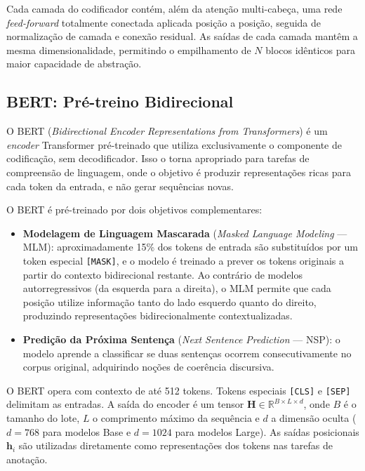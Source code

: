 Cada camada do codificador contém, além da atenção multi-cabeça, uma rede \textit{feed-forward}
totalmente conectada aplicada posição a posição, seguida de normalização de camada e conexão
residual. As saídas de cada camada mantêm a mesma dimensionalidade, permitindo o empilhamento
de $N$ blocos idênticos para maior capacidade de abstração.

\subsection{BERT: Pré-treino Bidirecional}
\label{subsec:bert}

O BERT (\textit{Bidirectional Encoder Representations from Transformers}) \cite{devlin2019bert}
é um \textit{encoder} Transformer pré-treinado que utiliza exclusivamente o componente de
codificação, sem decodificador. Isso o torna apropriado para tarefas de compreensão de
linguagem, onde o objetivo é produzir representações ricas para cada token da entrada, e não
gerar sequências novas.

O BERT é pré-treinado por dois objetivos complementares:

\begin{itemize}
    \item \textbf{Modelagem de Linguagem Mascarada} (\textit{Masked Language Modeling} —
    MLM): aproximadamente 15\% dos tokens de entrada são substituídos por um token especial
    \texttt{[MASK]}, e o modelo é treinado a prever os tokens originais a partir do contexto
    bidirecional restante. Ao contrário de modelos autorregressivos (da esquerda para a
    direita), o MLM permite que cada posição utilize informação tanto do lado esquerdo quanto
    do direito, produzindo representações bidirecionalmente contextualizadas.

    \item \textbf{Predição da Próxima Sentença} (\textit{Next Sentence Prediction} — NSP):
    o modelo aprende a classificar se duas sentenças ocorrem consecutivamente no corpus
    original, adquirindo noções de coerência discursiva.
\end{itemize}

O BERT opera com contexto de até 512 tokens. Tokens especiais \texttt{[CLS]} e \texttt{[SEP]}
delimitam as entradas. A saída do encoder é um tensor $\mathbf{H} \in \mathbb{R}^{B \times L
\times d}$, onde $B$ é o tamanho do lote, $L$ o comprimento máximo da sequência e $d$ a
dimensão oculta ($d = 768$ para modelos Base e $d = 1024$ para modelos Large). As saídas
posicionais $\mathbf{h}_i$ são utilizadas diretamente como representações dos tokens nas
tarefas de anotação.

